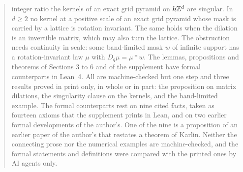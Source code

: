 \begin{abstract}
integer ratio the kernels of an exact grid pyramid on $h\ZZ^d$ are singular. In
$d \ge 2$ no kernel at a positive scale of an exact grid pyramid whose mask is carried by a lattice
is rotation invariant. The same holds when the dilation is an invertible matrix, which may also turn
the lattice. The obstruction needs continuity in scale: some band-limited mask $w$ of infinite
support has a rotation-invariant law $\mu$ with $D_q\mu = \mu * w$. The lemmas, propositions and
theorems of Sections 3 to 6 and of the supplement have formal counterparts in Lean~4. All are machine-checked but one step and three
results proved in print only, in whole or in part: the proposition on matrix dilations, the
singularity clause on the kernels, and the band-limited example. The formal counterparts rest on
nine cited facts, taken as fourteen axioms that the supplement prints in Lean, and on two earlier
formal developments of the author's. One of the nine is a proposition of an earlier paper of the
author's that restates a theorem of Karlin. Neither the connecting prose nor the
numerical examples are machine-checked, and the formal statements and definitions were compared
with the printed ones by AI agents only.
\end{abstract}
